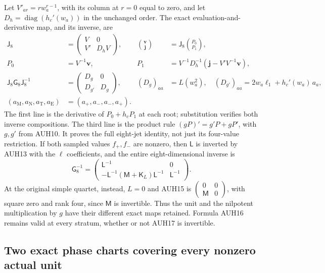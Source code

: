 Let $V'_{ar}=r w_a^{r-1}$, with its column at $r=0$ equal to zero,
and let $D_h=\operatorname{diag}(h_c'(w_a))$ in the unchanged order.
The exact evaluation-and-derivative map, and its inverse, are
\[
\begin{aligned}
 \mathsf J_8&=\begin{pmatrix}V&0\\V'&D_hV\end{pmatrix},&
 \binom{\mathbf v}{\mathbf j}&=\mathsf J_8\binom{P_0}{P_1},\\
 P_0&=V^{-1}\mathbf v,&
 P_1&=V^{-1}D_h^{-1}(\mathbf j-V'V^{-1}\mathbf v),\\
 \mathsf J_8\mathsf G_8\mathsf J_8^{-1}
 &=\begin{pmatrix}D_g&0\\D_{g'}&D_g\end{pmatrix},&
 (D_g)_{aa}&=L(w_a^2),\quad
 (D_{g'})_{aa}=2w_a\ell_1+h_c'(w_a)\,a_a,\\
 (a_{\mathrm M},a_{\mathrm N},a_{\mathrm T},a_{\mathrm E})
 &=(a_+,a_-,a_-,a_+).
\end{aligned}\tag{AUH16}
\]
The first line is the derivative of $P_0+h_cP_1$ at each root;
substitution verifies both inverse compositions.  The third line
is the product rule $(gP)'=g'P+gP'$, with $g,g'$ from AUH10.
It proves the full eight-jet identity, not just its four-value
restriction.  If both sampled values $f_+,f_-$ are nonzero, then
$\mathsf L$ is inverted by AUH13 with the $\ell$ coefficients,
and the entire eight-dimensional inverse is
\[
 \mathsf G_8^{-1}=
 \begin{pmatrix}
 \mathsf L^{-1}&0\\
 -\mathsf L^{-1}(\mathsf M+\mathsf K_L)\mathsf L^{-1}&\mathsf L^{-1}
 \end{pmatrix}.
 \tag{AUH17}
\]
At the original simple quartet, instead, $L=0$ and AUH15 is
$\left(\begin{smallmatrix}0&0\\\mathsf M&0\end{smallmatrix}\right)$,
with square zero and rank four, since $\mathsf M$ is invertible.
Thus the unit and the nilpotent multiplication by $g$ have their
different exact maps retained.  Formula AUH16 remains valid at
every stratum, whether or not AUH17 is invertible.

\subsection{Two exact phase charts covering every nonzero actual unit}

